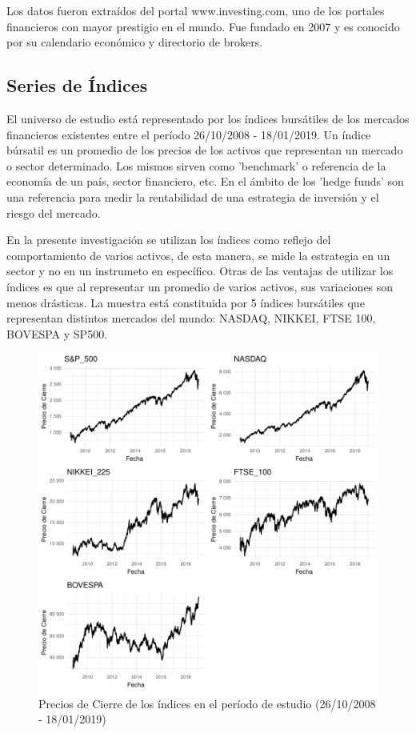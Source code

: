 \documentclass[a4paper,12pt]{Latex/Classes/PhDthesisPSnPDF}
\begin{document}
Los datos fueron extraídos del portal www.investing.com, uno de los portales financieros con mayor prestigio en el mundo. Fue fundado en 2007 y es conocido por su calendario económico y directorio de brokers.

\subsection{Series de Índices}

El universo de estudio está representado por los índices bursátiles de los mercados financieros existentes entre el período 26/10/2008 - 18/01/2019. Un índice búrsatil es un promedio de los precios de los activos que representan un mercado o sector determinado. Los mismos sirven como 'benchmark' o referencia de la economía de un país, sector financiero, etc. En el ámbito de los 'hedge funds' son una referencia para medir la rentabilidad de una estrategia de inversión y el riesgo del mercado.

En la presente investigación se utilizan los índices como reflejo del comportamiento de varios activos, de esta manera, se mide la estrategia en un sector y no en un instrumeto en específico. Otras de las ventajas de utilizar los índices es que al representar un promedio de varios activos, sus variaciones son menos drásticas. La muestra está constituida por 5 índices bursátiles que representan distintos mercados del mundo: NASDAQ, NIKKEI, FTSE 100, BOVESPA y SP500.



\begin{figure}[H]
\centering
\includegraphics{main-002}
\caption{Precios de Cierre de los índices en el período de estudio (26/10/2008 - 18/01/2019)}
\end{figure}
\end{document}
